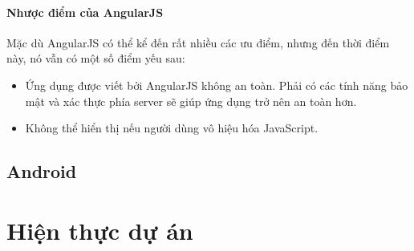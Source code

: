 \documentclass[a4paper]{article}
\begin{document}
\paragraph*{Nhược điểm của AngularJS}
Mặc dù AngularJS có thể kể đến rất nhiều các ưu điểm, nhưng đến thời điểm này, nó vẫn có một số điểm yếu sau:
\begin{itemize}
	\item Ứng dụng được viết bởi AngularJS không an toàn. Phải có các tính năng bảo mật và xác thực phía server sẽ giúp ứng dụng trở nên an toàn hơn.

	\item Không thể hiển thị nếu người dùng vô hiệu hóa JavaScript.
\end{itemize}

\subsection{Android}
\section{Hiện thực dự án}
\end{document}
